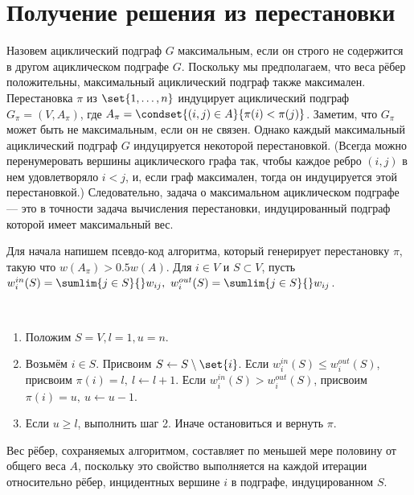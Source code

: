 \documentclass[a4paper, 12pt, oneside]{extarticle}  %
\begin{document}
\section{Получение решения из перестановки}

Назовем ациклический подграф $G$ максимальным, если он строго не содержится в другом ациклическом подграфе $G$. Поскольку мы предполагаем, что веса рёбер положительны, максимальный ациклический подграф также максимален. Перестановка $\pi$ из $\set{1, \ldots, n}$ индуцирует ациклический подграф $G_{\pi} = (V, A_{\pi})$, где $A_{\pi} = \condset{(i, j) \in A}{\pi(i) < \pi(j)}$. Заметим, что $G_{\pi}$ может быть не максимальным, если он не связен. Однако каждый максимальный ациклический подграф $G$ индуцируется некоторой перестановкой. (Всегда можно перенумеровать вершины ациклического графа так, чтобы каждое ребро $(i, j)$ в нем удовлетворяло $i < j$, и, если граф максимален, тогда он индуцируется этой перестановкой.) Следовательно, задача о максимальном ациклическом подграфе --- это в точности задача вычисления перестановки, индуцированный подграф которой имеет максимальный вес.

Для начала напишем псевдо-код алгоритма, который генерирует перестановку $\pi$, такую что $w(A_{\pi}) > 0.5w(A)$. Для $i \in V$ и $S \subset V$, пусть $w_{i}^{in}(S) = \sumlim{j \in S}{}w_{ij}, \ w_{i}^{out}(S) = \sumlim{j \in S}{}w_{ij}$.

\begin{algo}\label{alg:1}\ \par
  \begin{enumerate}[label=\arabic*)]
    \item Положим $S=V, l=1, u=n$.
    \item Возьмём $i \in S$. Присвоим $S \leftarrow S \setminus \set{i}$. Если $w_{i}^{in}(S) \le w_{i}^{out}(S)$, присвоим $\pi(i) = l,\ l \leftarrow l+1$. Если $w_{i}^{in}(S) > w_{i}^{out}(S)$, присвоим $\pi(i) = u,\ u \leftarrow u-1$.
    \item Если $u \ge l$, выполнить шаг 2. Иначе остановиться и вернуть $\pi$.
  \end{enumerate}
\end{algo}

Вес рёбер, сохраняемых алгоритмом, составляет по меньшей мере половину от общего веса $A$, поскольку это свойство выполняется на каждой итерации относительно рёбер, инцидентных вершине $i$ в подграфе, индуцированном $S$.

\end{document}
